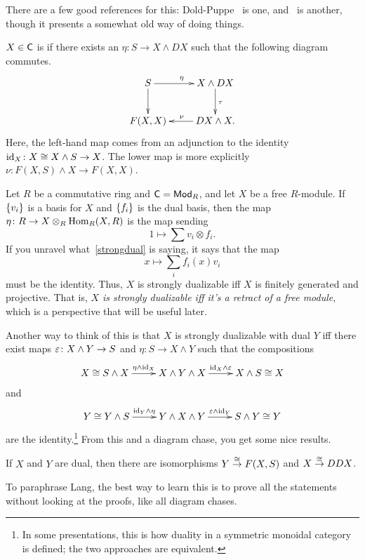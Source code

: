 There are a few good references for this: Dold-Puppe~\cite{DoldPuppe} is one, and~\cite{LMS} is another, though it
presents a somewhat old way of doing things.
\begin{defn}
$X\in\mathsf C$ is  if there exists an $\eta\colon S\to X\wedge DX$ such that the following
diagram commutes.
\begin{equation}
\label{strongdual}
\begin{gathered}
\xymatrix{
	S\ar[r]^\eta\ar[d] & X\wedge DX\ar[d]^\tau\\
	F(X,X) & DX\wedge X.\ar[l]_\nu
}
\end{gathered}
\end{equation}
Here, the left-hand map comes from an adjunction to the identity $\mathrm{id}_X\colon X\cong X\wedge S\to X$. The lower map
is more explicitly $\nu\colon F(X,S)\wedge X\to F(X,X)$.
\end{defn}
\begin{exm}
Let $R$ be a commutative ring and $\mathsf C = \mathsf{Mod}_R$, and let $X$ be a free $R$-module. If $\{v_i\}$ is a basis for
$X$ and $\{f_i\}$ is the dual basis, then the map $\eta\colon R\to X\otimes_R \operatorname{Hom}_R(X,R)$ is the map sending
\[1\mapsto \sum v_i\otimes f_i.\]
If you unravel what~\eqref{strongdual} is saying, it says that the map
\[x\mapsto \sum_i f_i(x)v_i\]
must be the identity. Thus, $X$ is strongly dualizable iff $X$ is finitely generated and projective. That is,
\emph{$X$ is strongly dualizable iff it's a retract of a free module}, which is a perspective that will be useful
later.
\end{exm}
Another way to think of this is that $X$ is strongly dualizable with dual $Y$ iff there exist maps $\varepsilon\colon
X\wedge Y\to S$ and $\eta\colon S\to X\wedge Y$ such that the compositions
\[\xymatrix{
	X\cong S\wedge X\ar[r]^-{\eta\wedge\id_X} & X\wedge Y\wedge X\ar[r]^-{\id_X\wedge\e} & X\wedge S\cong X
}\]
and
\[\xymatrix{
	Y\cong Y\wedge S\ar[r]^-{\id_Y\wedge\eta} & Y\wedge X\wedge Y\ar[r]^-{\e\wedge\id_Y} & S\wedge Y\cong Y
}\]
are the identity.\footnote{In some presentations, this is how duality in a symmetric monoidal category is defined;
the two approaches are equivalent.} From this and a diagram chase, you get some nice results.
\begin{prop} %
If $X$ and $Y$ are dual, then there are isomorphisms $Y\stackrel\cong\to F(X,S)$ and $X\stackrel\cong\to DDX$.
\end{prop}
To paraphrase Lang, the best way to learn this is to prove all the statements without looking at the proofs, like
all diagram chases.

